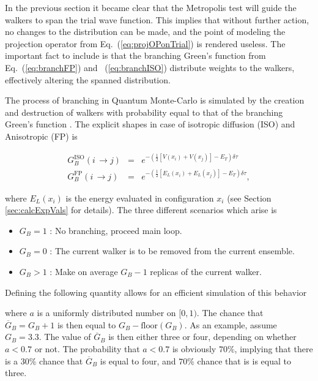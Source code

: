 In the previous section it became clear that the Metropolis test will guide the walkers to span the trial wave function. This implies that without further action, no changes to the distribution can be made, and the point of modeling the projection operator from Eq.~(\ref{eq:projOPonTrial}) is rendered useless. The important fact to include is that the branching Green's function from Eq.~(\ref{eq:branchFP}) and ~(\ref{eq:branchISO}) distribute weights to the walkers, effectively altering the spanned distribution. 

The process of branching in Quantum Monte-Carlo is simulated by the creation and destruction of walkers with probability equal to that of the branching Green's function \cite{abInitioMC}. The explicit shapes in case of isotropic diffusion (ISO) and Anisotropic (FP) is 

\begin{eqnarray}
 G_B^\mathrm{ISO}(i\,\rightarrow j) &=& e^{-\left(\frac{1}{2}\left[V(x_i) + V(x_j)\right] - E_T\right)\delta\tau}\label{eq:branchISO} \\
 G_B^\mathrm{FP}(i\,\rightarrow j) &=& e^{-\left(\frac{1}{2}\left[E_L(x_i) + E_L(x_j)\right] - E_T\right)\delta\tau}, \label{eq:branchFP}
\end{eqnarray}

where $E_L(x_i)$ is the energy evaluated in configuration $x_i$ (see Section \ref{sec:calcExpVals} for details). The three different scenarios which arise is

\begin{itemize}
 \item $G_B = 1$ : No branching, proceed main loop.
 \item $G_B = 0$ : The current walker is to be removed from the current ensemble.
 \item $G_B > 1$ : Make on average $G_B - 1$ replicas of the current walker.
\end{itemize}

Defining the following quantity allows for an efficient simulation of this behavior



where $a$ is a uniformly distributed number on $[0,1)$. The chance that $\overline{G}_B = G_B + 1$ is then equal to $G_B - \mathrm{floor}(G_B)$. As an example, assume $G_B = 3.3$. The value of $\overline{G}_B$ is then either three or four, depending on whether $a < 0.7$ or not. The probability that $a<0.7$ is obviously $70\%$, implying that there is a $30\%$ chance that $\overline{G}_B$ is equal to four, and $70\%$ chance that is is equal to three. 

